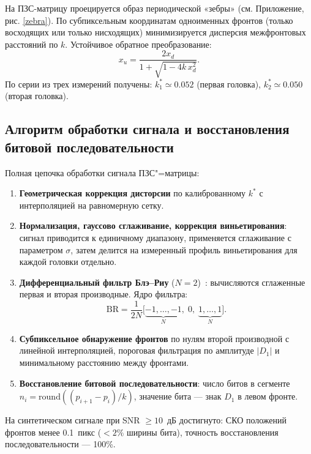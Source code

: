 На ПЗС-матрицу проецируется образ периодической «зебры» (см. Приложение, рис. \ref{zebra}). По субпиксельным координатам одноименных фронтов (только восходящих или только нисходящих) минимизируется дисперсия межфронтовых расстояний по $k$. Устойчивое обратное преобразование:
\begin{equation*}
    x_u = \frac{2x_d}{1 + \sqrt{1 - 4k\,x_d^2}}.
\end{equation*}
По серии из трех измерений получены: $k_1^* \simeq 0.052$ (первая головка), $k_2^* \simeq 0.050$ (вторая головка).

\subsection{Алгоритм обработки сигнала и восстановления битовой последовательности}

Полная цепочка обработки сигнала ПЗС"=матрицы:
\begin{enumerate}
    \item \textbf{Геометрическая коррекция дисторсии} по калиброванному $k^*$ с интерполяцией на равномерную сетку.
    \item \textbf{Нормализация, гауссово сглаживание, коррекция виньетирования}: сигнал приводится к единичному диапазону, применяется сглаживание с параметром $\sigma$, затем делится на измеренный профиль виньетирования для каждой головки отдельно.
    \item \textbf{Дифференциальный фильтр Блэ--Риу} ($N=2$)~\cite{blais_rioux_peak}: вычисляются сглаженные первая и вторая производные. Ядро фильтра:
        \begin{equation*}
            \mathrm{BR} = \frac{1}{2N}\bigl[\underbrace{-1,\ldots,-1}_{N},\;0,\;\underbrace{1,\ldots,1}_{N}\bigr].
        \end{equation*}
    \item \textbf{Субпиксельное обнаружение фронтов} по нулям второй производной с линейной интерполяцией, пороговая фильтрация по амплитуде $|D_1|$ и минимальному расстоянию между фронтами.
    \item \textbf{Восстановление битовой последовательности}: число битов в сегменте $n_i = \mathrm{round}((p_{i+1}-p_i)/k)$, значение бита --- знак $D_1$ в левом фронте.
\end{enumerate}

На синтетическом сигнале при SNR $\geq 10$~дБ достигнуто: СКО положений фронтов менее 0.1~пикс ($< 2\%$ ширины бита), точность восстановления последовательности --- 100\%.

